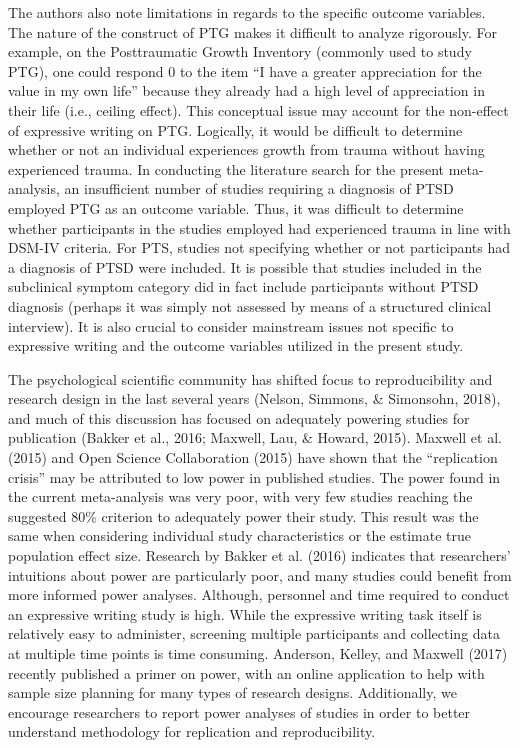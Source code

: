 \documentclass[,man]{apa6}
\begin{document}
The authors also note limitations in regards to the specific outcome variables. The nature of the construct of PTG makes it difficult to analyze rigorously. For example, on the Posttraumatic Growth Inventory (commonly used to study PTG), one could respond 0 to the item \enquote{I have a greater appreciation for the value in my own life} because they already had a high level of appreciation in their life (i.e., ceiling effect). This conceptual issue may account for the non-effect of expressive writing on PTG. Logically, it would be difficult to determine whether or not an individual experiences growth from trauma without having experienced trauma. In conducting the literature search for the present meta-analysis, an insufficient number of studies requiring a diagnosis of PTSD employed PTG as an outcome variable. Thus, it was difficult to determine whether participants in the studies employed had experienced trauma in line with DSM-IV criteria. For PTS, studies not specifying whether or not participants had a diagnosis of PTSD were included. It is possible that studies included in the subclinical symptom category did in fact include participants without PTSD diagnosis (perhaps it was simply not assessed by means of a structured clinical interview). It is also crucial to consider mainstream issues not specific to expressive writing and the outcome variables utilized in the present study.

The psychological scientific community has shifted focus to reproducibility and research design in the last several years (Nelson, Simmons, \& Simonsohn, 2018), and much of this discussion has focused on adequately powering studies for publication (Bakker et al., 2016; Maxwell, Lau, \& Howard, 2015). Maxwell et al. (2015) and Open Science Collaboration (2015) have shown that the \enquote{replication crisis} may be attributed to low power in published studies. The power found in the current meta-analysis was very poor, with very few studies reaching the suggested 80\% criterion to adequately power their study. This result was the same when considering individual study characteristics or the estimate true population effect size. Research by Bakker et al. (2016) indicates that researchers' intuitions about power are particularly poor, and many studies could benefit from more informed power analyses. Although, personnel and time required to conduct an expressive writing study is high. While the expressive writing task itself is relatively easy to administer, screening multiple participants and collecting data at multiple time points is time consuming. Anderson, Kelley, and Maxwell (2017) recently published a primer on power, with an online application to help with sample size planning for many types of research designs. Additionally, we encourage researchers to report power analyses of studies in order to better understand methodology for replication and reproducibility.
\end{document}
